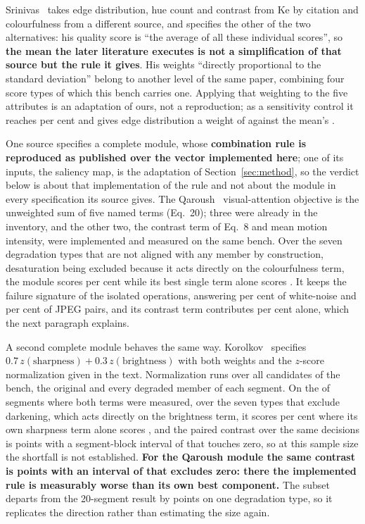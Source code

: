 Srinivas~\citep{srinivas2016rank} takes edge distribution, hue count and contrast from Ke by
citation and colourfulness from a different source, and specifies the other of the two
alternatives: his
quality score is ``the average of all these individual scores'', so \textbf{the mean the
later literature executes is not a simplification of that source but the rule it gives}.
His weights ``directly proportional to the standard deviation'' belong to another level of
the same paper, combining four score types of which this bench carries one. Applying that
weighting to the five attributes is an adaptation of ours, not a reproduction; as a
sensitivity control it reaches \regraSrinivasAdapt{} per cent and gives edge distribution a
weight of \regraPesoZero{} against the mean's \regraPesoMedia{}.

One source specifies a complete module, whose \textbf{combination rule is reproduced as published over the vector implemented here}; one of its inputs, the saliency map, is the adaptation of Section~\ref{sec:method}, so the verdict below is about that implementation of the rule and not about the module in every specification its source gives. The Qaroush~\citep{qaroush2025diversity} visual-attention objective is the unweighted sum of five named terms
(Eq.~20); three were already in the inventory, and the other two, the contrast term of
Eq.~8 and mean motion intensity, were implemented and measured on the same bench. Over the
seven degradation types that are not aligned with any member by construction, desaturation
being excluded because it acts directly on the colourfulness term, the module
scores \vaModulo{} per cent while its best single term alone scores \vaMelhorMembro{}. It keeps the failure signature of the isolated operations, answering \vaRuido{} per cent of
white-noise and \vaJpeg{} per cent of JPEG pairs, and its contrast term contributes
\vaCT{} per cent alone, which the next paragraph explains.

A second complete module behaves the same way. Korolkov~\citep{korolkov2025keyframe}
specifies
$0.7\,z(\text{sharpness})+0.3\,z(\text{brightness})$ with both weights and the $z$-score
normalization given in the text. Normalization runs over all candidates of the bench, the original and every degraded
member of each segment. On the \koN{} of \koDe{} segments where both terms were measured,
over the seven types that exclude darkening, which acts directly on the brightness term, it
scores \koModulo{} per cent where its own sharpness term alone scores
\koMelhorMembro{}, and the paired contrast over the same decisions is
\koContraste{} points with a segment-block interval of \koIC{} that touches zero, so at this
sample size the shortfall is not established. \textbf{For the Qaroush module the same
contrast is \vaContraste{} points with an interval of \vaIC{} that excludes zero: there the
implemented rule is measurably worse than its own best component.} The subset departs from the 20-segment result by \koPortao{} points on one
degradation type, so it replicates the direction rather than estimating the size again.


